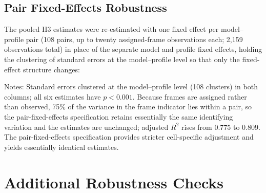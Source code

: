 \begin{table}[htbp]
\begin{flushleft}
\end{flushleft}
\end{table}

\subsection*{Pair Fixed-Effects Robustness}
\label{app:h3-pairfe}

The pooled H3 estimates were re-estimated with one fixed effect per model--profile pair (108 pairs, up to twenty assigned-frame observations each; 2,159 observations total) in place of the separate model and profile fixed effects, holding the clustering of standard errors at the model--profile level so that only the fixed-effect structure changes:

\begin{table}[htbp]
\centering
\caption{Pooled H3 estimates under two-way and pair fixed effects}
\label{tab:h3_pairfe}
\begin{flushleft}
\footnotesize Notes: Standard errors clustered at the model--profile level (108 clusters) in both columns; all six estimates have \(p<0.001\). Because frames are assigned rather than observed, 75\% of the variance in the frame indicator lies within a pair, so the pair-fixed-effects specification retains essentially the same identifying variation and the estimates are unchanged; adjusted \(R^2\) rises from 0.775 to 0.809. The pair-fixed-effects specification provides stricter cell-specific adjustment and yields essentially identical estimates.
\end{flushleft}
\end{table}

\clearpage   %
\section{Additional Robustness Checks}
\label{app:additional-robustness}

